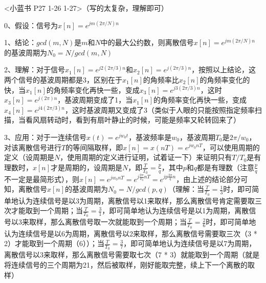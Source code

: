 <小蓝书 P27 1-26 1-27>（写的太复杂，理解即可）

0、假设：信号为$x[n]=e^{jm(2\pi / N)n}$

1、结论：$gcd(m,N)$是$m$和$N$中的最大公约数，则离散信号$x[n]=e^{jm(2\pi / N)n}$的基波周期为$N_0 = N / gcd(m,N)$

2、理解：对于信号$x_1[n]=e^{j2(2\pi / 3)n}$和$x_2[n]=e^{j(2\pi / 3)n}$，按照以上结论，这两个信号的基波周期都是3，区别在于$x_1[n]$的角频率比$x_2[n]$的角频率变化的快，当$x_1[n]$的角频率变化再快一些，变成$x_3[n]=e^{j3(2\pi / 3)n}$，这时$x_3[n]=e^{j(2\pi)n}$，基波周期变成了1，当$x_1[n]$的角频率变化再快一些，变成$x_4[n]=e^{j4(2\pi / 3)n}$，这时基波周期又变成了3（类似于人眼的只能按照指定频率扫描，当看风扇转动时，看到有扇叶静止的时候，可能是频率又轮转回来了）

3、应用：对于一连续信号$x(t)=e^{jw_0t}$，基波频率是$w_0$，基波周期$T_0$是$2\pi / w_0$，对该离散信号进行$T$的等间隔取样，即$x[n] = x(nT) = e^{jw_0nT}$，可以使用周期的定义（设周期是$N$，使用周期的定义进行证明，试着证一下）来证明只有$T/T_0$是有理数时，$x[n]$才是周期的，设周期是$N$，即$\frac{T}{T_0}=\frac{p}{q}$，其中$p$和$q$都是有理数（注意$\frac{p}{q}$不一定是最简形式），则$x[n] = e^{jw_0nT} = e^{j\frac{2\pi}{T_0}nT} = e^{jp\frac{2\pi}{q}n}$，由上述的结论部分可知，离散信号$x[n]$的基波周期为$N_0 = N / gcd(p,q)$（理解：当$\frac{T}{T_0}=\frac{1}{3}$时，即可简单地认为连续信号是以3为周期，离散信号以1来取样，那么离散信号肯定需要取三次才能取到一个周期；当$\frac{T}{T_0}=\frac{3}{1}$，即可简单地认为连续信号是以1为周期，离散信号以3来取样，那么离散信号取一次就能取到一个周期；当$\frac{T}{T_0}=\frac{2}{6}$时，即可简单地认为连续信号是以6为周期，离散信号以2来取样，那么离散信号需要取三次（3 * 2）才能取到一个周期（6））；当$\frac{T}{T_0}=\frac{3}{7}$，即可简单地认为连续信号是以7为周期，离散信号以3来取样，那么离散信号需要取七次（7 * 3）就能取到一个周期（就是将连续信号的三个周期为21，然后被取样，刚好能取完整，续上下一个离散的取样）

